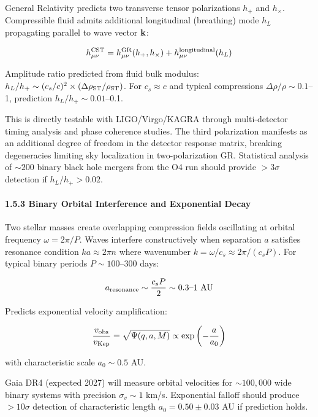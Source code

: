 \documentclass[11pt,a4paper]{article}
\begin{document}
General Relativity predicts two transverse tensor polarizations \(h_+\)
and \(h_\times\). Compressible fluid admits additional longitudinal
(breathing) mode \(h_L\) propagating parallel to wave vector
\({\bf k}\):

\[h_{\mu\nu}^{\rm CST} = h_{\mu\nu}^{\rm GR}(h_+, h_\times) + h_{\mu\nu}^{\rm longitudinal}(h_L)\]

Amplitude ratio predicted from fluid bulk modulus:
\(h_L/h_+ \sim (c_s/c)^2 \times (\Delta\rho_{\rm ST}/\rho_{\rm ST})\).
For \(c_s \approx c\) and typical compressions
\(\Delta\rho/\rho \sim 0.1\)--1, prediction \(h_L/h_+ \sim 0.01\)--0.1.

This is directly testable with LIGO/Virgo/KAGRA through multi-detector
timing analysis and phase coherence studies. The third polarization
manifests as an additional degree of freedom in the detector response
matrix, breaking degeneracies limiting sky localization in
two-polarization GR. Statistical analysis of \(\sim 200\) binary black
hole mergers from the O4 run should provide \(>3\sigma\) detection if
\(h_L/h_+ > 0.02\).

\hypertarget{binary-orbital-interference-and-exponential-decay}{%
\paragraph{1.5.3 Binary Orbital Interference and Exponential
Decay}\label{binary-orbital-interference-and-exponential-decay}}

Two stellar masses create overlapping compression fields oscillating at
orbital frequency \(\omega = 2\pi/P\). Waves interfere constructively
when separation \(a\) satisfies resonance condition
\(ka \approx 2\pi n\) where wavenumber
\(k = \omega/c_s \approx 2\pi/(c_s P)\). For typical binary periods
\(P \sim 100\)--300 days:

\[a_{\rm resonance} \sim \frac{c_s P}{2} \sim 0.3\text{--}1~{\rm AU}\]

Predicts exponential velocity amplification:

\[\frac{v_{\rm obs}}{v_{\rm Kep}} = \sqrt{\Psi(q,a,M)} \propto \exp\left(-\frac{a}{a_0}\right)\]

with characteristic scale \(a_0 \sim 0.5\) AU.

Gaia DR4 (expected 2027) will measure orbital velocities for
\(\sim 100,000\) wide binary systems with precision \(\sigma_v \sim 1\)
km/s. Exponential falloff should produce \(>10\sigma\) detection of
characteristic length \(a_0 = 0.50 \pm 0.03\) AU if prediction holds.
\end{document}
